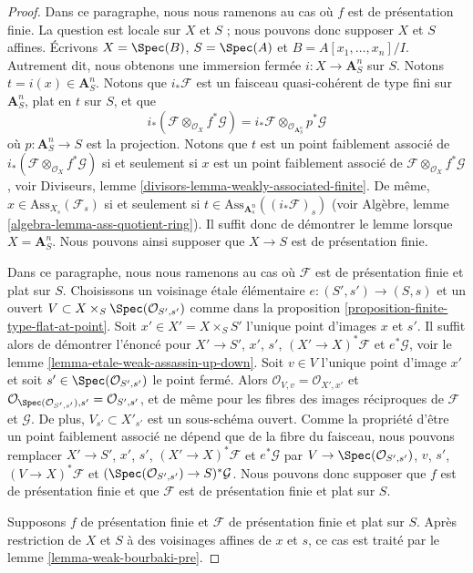 \begin{proof}
Dans ce paragraphe, nous nous ramenons au cas où $f$ est de présentation finie.
La question est locale sur $X$ et $S$ ; nous pouvons donc supposer $X$ et $S$
affines. Écrivons $X = \Spec(B)$, $S = \Spec(A)$ et
$B = A[x_1, \ldots, x_n]/I$. Autrement dit, nous obtenons une immersion fermée
$i : X \to \mathbf{A}^n_S$ sur $S$. Notons $t = i(x) \in \mathbf{A}^n_S$.
Notons que $i_*\mathcal{F}$ est un faisceau quasi-cohérent de type fini sur
$\mathbf{A}^n_S$, plat en $t$ sur $S$, et que
$$
i_*(\mathcal{F} \otimes_{\mathcal{O}_X} f^*\mathcal{G}) =
i_*\mathcal{F} \otimes_{\mathcal{O}_{\mathbf{A}^n_S}} p^*\mathcal{G}
$$
où $p : \mathbf{A}^n_S \to S$ est la projection. Notons que
$t$ est un point faiblement associé de
$i_*(\mathcal{F} \otimes_{\mathcal{O}_X} f^*\mathcal{G})$
si et seulement si $x$ est un point faiblement associé de
$\mathcal{F} \otimes_{\mathcal{O}_X} f^*\mathcal{G}$, voir
Diviseurs, lemme \ref{divisors-lemma-weakly-associated-finite}.
De même, $x \in \text{Ass}_{X_s}(\mathcal{F}_s)$ si et seulement
si $t \in \text{Ass}_{\mathbf{A}^n_s}((i_*\mathcal{F})_s)$ (voir
Algèbre, lemme \ref{algebra-lemma-ass-quotient-ring}).
Il suffit donc de démontrer le lemme lorsque $X = \mathbf{A}^n_S$.
Nous pouvons ainsi supposer que $X \to S$ est de présentation finie.

\medskip\noindent
Dans ce paragraphe, nous nous ramenons au cas où $\mathcal{F}$ est de présentation finie
et plat sur $S$.
Choisissons un voisinage \'etale élémentaire $e : (S', s') \to (S, s)$
et un ouvert $V \subset X \times_S \Spec(\mathcal{O}_{S', s'})$
comme dans la proposition \ref{proposition-finite-type-flat-at-point}.
Soit $x' \in X' = X \times_S S'$ l'unique point d'images $x$
et $s'$. Il suffit alors de démontrer l'énoncé pour
$X' \to S'$, $x'$, $s'$, $(X' \to X)^*\mathcal{F}$ et $e^*\mathcal{G}$, voir
le lemme \ref{lemma-etale-weak-assassin-up-down}.
Soit $v \in V$ l'unique point d'image $x'$
et soit $s' \in \Spec(\mathcal{O}_{S', s'})$ le point fermé.
Alors $\mathcal{O}_{V, v} = \mathcal{O}_{X', x'}$
et $\mathcal{O}_{\Spec(\mathcal{O}_{S', s'}), s'} =
\mathcal{O}_{S', s'}$, et de même pour les fibres des images réciproques de
$\mathcal{F}$ et $\mathcal{G}$.
De plus, $V_{s'} \subset X'_{s'}$ est un sous-schéma ouvert.
Comme la propriété d'être un point faiblement associé
ne dépend que de la fibre du faisceau, nous pouvons
remplacer
$X' \to S'$, $x'$, $s'$, $(X' \to X)^*\mathcal{F}$ et $e^*\mathcal{G}$
par
$V \to \Spec(\mathcal{O}_{S', s'})$, $v$, $s'$, $(V \to X)^*\mathcal{F}$
et $(\Spec(\mathcal{O}_{S', s'}) \to S)^*\mathcal{G}$.
Nous pouvons donc supposer que $f$ est de présentation finie et que
$\mathcal{F}$ est de présentation finie et plat sur $S$.

\medskip\noindent
Supposons $f$ de présentation finie et
$\mathcal{F}$ de présentation finie et plat sur $S$.
Après restriction de $X$ et $S$ à des voisinages affines
de $x$ et $s$, ce cas est traité par le
lemme \ref{lemma-weak-bourbaki-pre}.
\end{proof}


